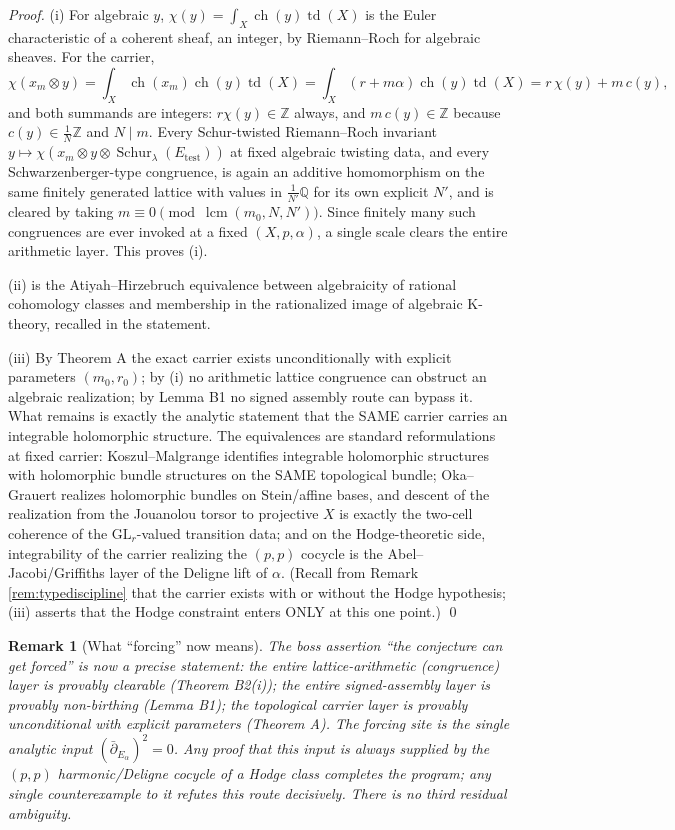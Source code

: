 \documentclass[11pt]{article}
\newtheorem{remark}[theorem]{Remark}
\newcommand{\ch}{\operatorname{ch}}
\newcommand{\td}{\operatorname{td}}
\newcommand{\ddbar}{\bar\partial}
\begin{document}
\begin{proof}
(i) For algebraic $y$, $\chi(y)=\int_X\ch(y)\td(X)$ is the Euler
characteristic of a coherent sheaf, an integer, by Riemann--Roch for
algebraic sheaves. For the carrier,
\[
  \chi(x_m\otimes y)
  =\int_X \ch(x_m)\ch(y)\td(X)
  =\int_X (r+m\alpha)\ch(y)\td(X)
  =r\,\chi(y)+m\,c(y),
\]
and both summands are integers: $r\chi(y)\in\mathbb Z$ always, and
$m\,c(y)\in\mathbb Z$ because $c(y)\in\frac1N\mathbb Z$ and $N\mid m$.
Every Schur-twisted Riemann--Roch invariant
$y\mapsto\chi(x_m\otimes y\otimes\operatorname{Schur}_\lambda(E_{\mathrm{test}}))$
at fixed algebraic twisting data, and every Schwarzenberger-type
congruence, is again an additive homomorphism on the same finitely
generated lattice with values in $\frac1{N'}\mathbb Q$ for its own
explicit $N'$, and is cleared by taking
$m\equiv 0\pmod{\operatorname{lcm}(m_0,N,N')}$.
Since finitely many such congruences are ever invoked at a fixed
$(X,p,\alpha)$, a single scale clears the entire arithmetic layer.
This proves (i).

(ii) is the Atiyah--Hirzebruch equivalence between algebraicity of
rational cohomology classes and membership in the rationalized image of
algebraic K-theory, recalled in the statement.

(iii) By Theorem A the exact carrier exists unconditionally with
explicit parameters $(m_0,r_0)$; by (i) no arithmetic lattice
congruence can obstruct an algebraic realization;
by Lemma B1 no signed assembly route can bypass it. What remains is
exactly the analytic statement that the SAME carrier carries an
integrable holomorphic structure. The equivalences are standard
reformulations at fixed carrier: Koszul--Malgrange identifies integrable
holomorphic structures with holomorphic bundle structures on the
SAME topological bundle; Oka--Grauert realizes holomorphic bundles on
Stein/affine bases, and descent of the realization from the Jouanolou
torsor to projective $X$ is exactly the two-cell coherence of the
$\mathrm{GL}_r$-valued transition data; and on the Hodge-theoretic
side, integrability of the carrier realizing the $(p,p)$ cocycle is the
Abel--Jacobi/Griffiths layer of the Deligne lift of $\alpha$.
(Recall from Remark \ref{rem:typediscipline} that the carrier exists
with or without the Hodge hypothesis; (iii) asserts that the Hodge
constraint enters ONLY at this one point.) \qed
\end{proof}

\begin{remark}[What ``forcing'' now means]
The boss assertion ``the conjecture can get forced'' is now a precise
statement: the entire lattice-arithmetic (congruence) layer is provably
clearable (Theorem B2(i)); the entire signed-assembly layer is provably
non-birthing (Lemma B1); the topological carrier layer is provably
unconditional with explicit parameters (Theorem A). The forcing site
is the single analytic input $(\ddbar_{E_\alpha})^2=0$. Any proof that
this input is always supplied by the $(p,p)$ harmonic/Deligne cocycle
of a Hodge class completes the program; any single counterexample to it
refutes this route decisively. There is no third residual ambiguity.
\end{remark}
\end{document}
